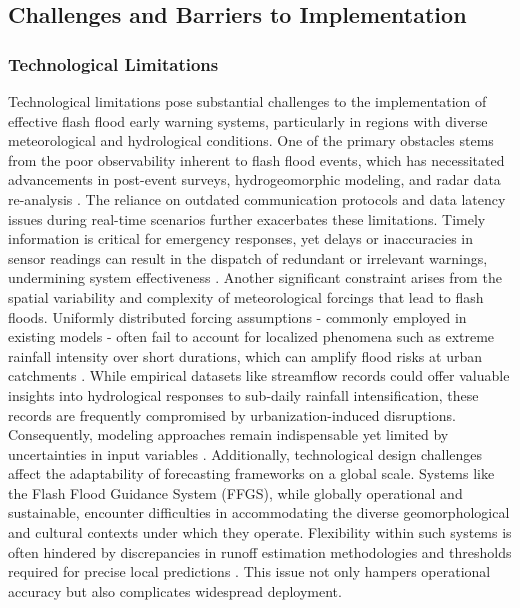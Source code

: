 \subsection{Challenges and Barriers to Implementation}

\subsubsection{Technological Limitations}
Technological limitations pose substantial challenges to the implementation of effective flash flood early warning systems, particularly in regions with diverse meteorological and hydrological conditions. One of the primary obstacles stems from the poor observability inherent to flash flood events, which has necessitated advancements in post-event surveys, hydrogeomorphic modeling, and radar data re-analysis \citep{Borga2019}. The reliance on outdated communication protocols and data latency issues during real-time scenarios further exacerbates these limitations. Timely information is critical for emergency responses, yet delays or inaccuracies in sensor readings can result in the dispatch of redundant or irrelevant warnings, undermining system effectiveness \citep{Khan2020}.
Another significant constraint arises from the spatial variability and complexity of meteorological forcings that lead to flash floods. Uniformly distributed forcing assumptions - commonly employed in existing models - often fail to account for localized phenomena such as extreme rainfall intensity over short durations, which can amplify flood risks at urban catchments \citep{Douinot2016}. While empirical datasets like streamflow records could offer valuable insights into hydrological responses to sub-daily rainfall intensification, these records are frequently compromised by urbanization-induced disruptions. Consequently, modeling approaches remain indispensable yet limited by uncertainties in input variables \citep{Fowler2021}.
Additionally, technological design challenges affect the adaptability of forecasting frameworks on a global scale. Systems like the Flash Flood Guidance System (FFGS), while globally operational and sustainable, encounter difficulties in accommodating the diverse geomorphological and cultural contexts under which they operate. Flexibility within such systems is often hindered by discrepancies in runoff estimation methodologies and thresholds required for precise local predictions \citep{Georgakakos2022}\citep{Naulin2013}. This issue not only hampers operational accuracy but also complicates widespread deployment.

